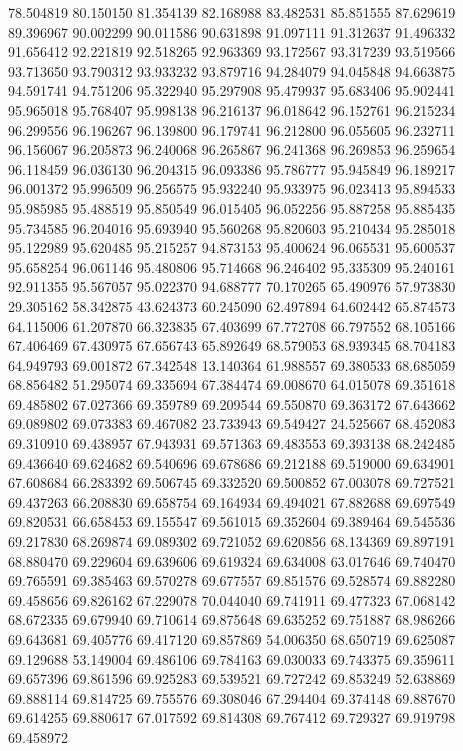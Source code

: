 78.504819
80.150150
81.354139
82.168988
83.482531
85.851555
87.629619
89.396967
90.002299
90.011586
90.631898
91.097111
91.312637
91.496332
91.656412
92.221819
92.518265
92.963369
93.172567
93.317239
93.519566
93.713650
93.790312
93.933232
93.879716
94.284079
94.045848
94.663875
94.591741
94.751206
95.322940
95.297908
95.479937
95.683406
95.902441
95.965018
95.768407
95.998138
96.216137
96.018642
96.152761
96.215234
96.299556
96.196267
96.139800
96.179741
96.212800
96.055605
96.232711
96.156067
96.205873
96.240068
96.265867
96.241368
96.269853
96.259654
96.118459
96.036130
96.204315
96.093386
95.786777
95.945849
96.189217
96.001372
95.996509
96.256575
95.932240
95.933975
96.023413
95.894533
95.985985
95.488519
95.850549
96.015405
96.052256
95.887258
95.885435
95.734585
96.204016
95.693940
95.560268
95.820603
95.210434
95.285018
95.122989
95.620485
95.215257
94.873153
95.400624
96.065531
95.600537
95.658254
96.061146
95.480806
95.714668
96.246402
95.335309
95.240161
92.911355
95.567057
95.022370
94.688777
70.170265
65.490976
57.973830
29.305162
58.342875
43.624373
60.245090
62.497894
64.602442
65.874573
64.115006
61.207870
66.323835
67.403699
67.772708
66.797552
68.105166
67.406469
67.430975
67.656743
65.892649
68.579053
68.939345
68.704183
64.949793
69.001872
67.342548
13.140364
61.988557
69.380533
68.685059
68.856482
51.295074
69.335694
67.384474
69.008670
64.015078
69.351618
69.485802
67.027366
69.359789
69.209544
69.550870
69.363172
67.643662
69.089802
69.073383
69.467082
23.733943
69.549427
24.525667
68.452083
69.310910
69.438957
67.943931
69.571363
69.483553
69.393138
68.242485
69.436640
69.624682
69.540696
69.678686
69.212188
69.519000
69.634901
67.608684
66.283392
69.506745
69.332520
69.500852
67.003078
69.727521
69.437263
66.208830
69.658754
69.164934
69.494021
67.882688
69.697549
69.820531
66.658453
69.155547
69.561015
69.352604
69.389464
69.545536
69.217830
68.269874
69.089302
69.721052
69.620856
68.134369
69.897191
68.880470
69.229604
69.639606
69.619324
69.634008
63.017646
69.740470
69.765591
69.385463
69.570278
69.677557
69.851576
69.528574
69.882280
69.458656
69.826162
67.229078
70.044040
69.741911
69.477323
67.068142
68.672335
69.679940
69.710614
69.875648
69.635252
69.751887
68.986266
69.643681
69.405776
69.417120
69.857869
54.006350
68.650719
69.625087
69.129688
53.149004
69.486106
69.784163
69.030033
69.743375
69.359611
69.657396
69.861596
69.925283
69.539521
69.727242
69.853249
52.638869
69.888114
69.814725
69.755576
69.308046
67.294404
69.374148
69.887670
69.614255
69.880617
67.017592
69.814308
69.767412
69.729327
69.919798
69.458972
